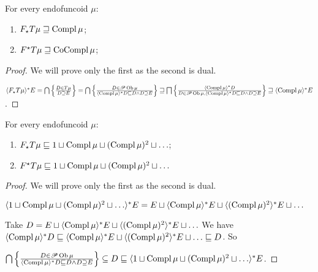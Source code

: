 \begin{prop}
  For every endofuncoid $\mu$:
  \begin{enumerate}
    \item $F_{\star} T \mu \sqsupseteq \operatorname{Compl} \mu$;
    
    \item $F^{\star} T \mu \sqsupseteq \operatorname{CoCompl} \mu$;
  \end{enumerate}
\end{prop}

\begin{proof}
  We will prove only the first as the second is dual.
  
  $\langle F_{\star} T \mu \rangle^{\ast} E =
  \bigcap \left\{ \frac{ D \in T \mu
  }{ D \supseteq E }\right\} = \bigcap \left\{ \frac{ D \in
  \mathscr{P} \operatorname{Ob} \mu }{ \langle \operatorname{Compl}
  \mu \rangle^{\ast} D \sqsubseteq D \wedge D \supseteq E }\right\} \sqsupseteq
  \bigsqcap \left\{ \frac{ \langle \operatorname{Compl} \mu \rangle^{\ast} D }{
  D \in \mathscr{P} \operatorname{Ob} \mu, \langle \operatorname{Compl} \mu
  \rangle^{\ast} D \sqsubseteq D \wedge D \supseteq E }\right\} \sqsupseteq
  \langle \operatorname{Compl} \mu \rangle^{\ast} E$.
\end{proof}

\begin{lem}
  For every endofuncoid $\mu$:
  \begin{enumerate}
    \item $F_{\star} T \mu \sqsubseteq 1 \sqcup \operatorname{Compl} \mu \sqcup
    (\operatorname{Compl} \mu)^2 \sqcup \ldots$;
    
    \item $F^{\star} T \mu \sqsubseteq 1 \sqcup \operatorname{Compl} \mu \sqcup
    (\operatorname{Compl} \mu)^2 \sqcup \ldots$
  \end{enumerate}
\end{lem}

\begin{proof}
  We will prove only the first as the second is dual.
  
  $\langle 1 \sqcup \operatorname{Compl} \mu \sqcup (\operatorname{Compl} \mu)^2 \sqcup \ldots
  \rangle^{\ast} E = E \sqcup \langle \operatorname{Compl} \mu \rangle^{\ast} E \sqcup
  \langle (\operatorname{Compl} \mu)^2 \rangle^{\ast} E \sqcup \ldots$
  
  Take $D = E \sqcup \langle \operatorname{Compl} \mu \rangle^{\ast} E \sqcup \langle
  (\operatorname{Compl} \mu)^2 \rangle^{\ast} E \sqcup \ldots$ We have $\langle
  \operatorname{Compl} \mu \rangle^{\ast} D \sqsubseteq \langle \operatorname{Compl} \mu
  \rangle^{\ast} E \sqcup \langle (\operatorname{Compl} \mu)^2 \rangle^{\ast} E \sqcup
  \ldots \sqsubseteq D$. So
  
  $\bigcap \left\{ \frac{ D \in \mathscr{P} \operatorname{Ob} \mu }{
  \langle \operatorname{Compl} \mu \rangle^{\ast} D \sqsubseteq D \wedge D \supseteq E
  }\right\} \subseteq D \sqsubseteq \langle 1 \sqcup \operatorname{Compl} \mu \sqcup
  (\operatorname{Compl} \mu)^2 \sqcup \ldots \rangle^{\ast} E$.
\end{proof}

